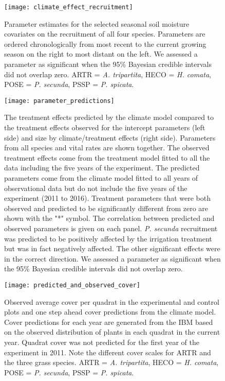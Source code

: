 \documentclass[11pt]{article}
\begin{document}
\begin{figure}[!htbp]
	\centering
	\texttt{[image: climate\_effect\_recruitment]}
	\caption{Parameter estimates for the selected seasonal soil moisture covariates on the recruitment of all four species. Parameters are ordered chronologically from most recent to the current growing season on the right to most distant on the left. We assessed a parameter as significant when the 95\% Bayesian credible intervals did not overlap zero.  ARTR = \textit{A. tripartita}, HECO = \textit{H. comata}, POSE = \textit{P. secunda}, PSSP = \textit{P. spicata}. }
	\label{fig:climateRecruitment}
\end{figure}

\begin{figure}[!htbp]
	\centering
	\texttt{[image: parameter\_predictions]}
	\caption{The treatment effects predicted by the climate model compared to the treatment effects observed for the intercept parameters (left side) and size by climate/treatment effects (right side). Parameters from all species and vital rates are shown together. The observed treatment effects come from the treatment model fitted to all the data including the five years of the experiment.  The predicted parameters come from the climate model fitted to all years of observational data but do not include the five years of the experiment (2011 to 2016).  Treatment parameters that were both observed and predicted to be significantly different from zero are shown with the "*" symbol. The correlation between predicted and observed parameters is given on each panel. \textit{P. secunda} recruitment was predicted to be positively affected by the irrigation treatment but was in fact negatively affected. The other significant effects were in the correct direction. We assessed a parameter as significant when the 95\% Bayesian credible intervals did not overlap zero.}
	\label{fig:parPredictions}
\end{figure}

\begin{figure}[!htbp]
	\centering
	\texttt{[image: predicted\_and\_observed\_cover]}
	\caption{Observed average cover per quadrat in the experimental and control plots and one step ahead cover predictions from the climate model. Cover predictions for each year are generated from the IBM based on the observed distribution of plants in each quadrat in the current year. Quadrat cover was not predicted for the first year of the experiment in 2011.  Note the different cover scales for ARTR and the three grass species. ARTR = \textit{A. tripartita}, HECO = \textit{H. comata}, POSE = \textit{P. secunda}, PSSP = \textit{P. spicata}.}
	\label{fig:coverPred}
\end{figure}
\end{document}
